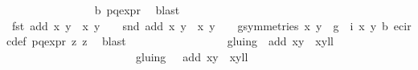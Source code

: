 \begin{isabellebody}
\ \ \ \ \ \ \ \ \ \ \ \ \ \ \isamarkupfalse%
\ b{\isacharparenleft}{}{\isacharparenright}\ p{\isacharunderscore}q{\isacharunderscore}expr{\isacharparenleft}{}{\isacharparenright}\ \isamarkupfalse%
\ blast\ \ \isanewline
\ \ \ \ \ \ \ \ \ \ \ \ \ \ \isamarkupfalse%
\ {\isacartoucheopen}fst\ {\isacharparenleft}add\ {\isacharparenleft}x{\isacharcomma}\ y{\isacharparenright}\ {\isacharparenleft}{\isasymtau}\ {\isacharparenleft}x{\isacharprime}{\isacharcomma}\ y{\isacharprime}{\isacharparenright}{\isacharparenright}{\isacharparenright}\ {\isacharequal}\ {}\ {\isasymor}\ snd\ {\isacharparenleft}add\ {\isacharparenleft}x{\isacharcomma}\ y{\isacharparenright}\ {\isacharparenleft}{\isasymtau}\ {\isacharparenleft}x{\isacharprime}{\isacharcomma}\ y{\isacharprime}{\isacharparenright}{\isacharparenright}{\isacharparenright}\ {\isacharequal}\ {}\ {\isasymLongrightarrow}\ {\isasymexists}g{\isasymin}symmetries{\isachardot}\ {\isacharparenleft}x{\isacharprime}{\isacharcomma}\ y{\isacharprime}{\isacharparenright}\ {\isacharequal}\ {\isacharparenleft}g\ {\isasymcirc}\ i{\isacharparenright}\ {\isacharparenleft}x{\isacharcomma}\ y{\isacharparenright}{\isacartoucheclose}\ b{\isacharparenleft}{}{\isacharparenright}\ e{\isacharunderscore}circ{\isacharunderscore}def\ p{\isacharunderscore}q{\isacharunderscore}expr{\isacharparenleft}{}{\isacharparenright}\ z{}{\isacharparenleft}{}{\isacharparenright}\ z{}{\isacharparenleft}{}{\isacharparenright}\ \isamarkupfalse%
\ blast\ \isanewline
\ \ \ \ \ \ \ \ \ \ \ \ \isamarkupfalse%
\ \isamarkupfalse%
\ {}{\isacharcolon}\ {\isachardoublequoteopen}gluing\ {\isacharbackquote}{\isacharbackquote}\ {\isacharbraceleft}{\isacharparenleft}{\isacharparenleft}add\ {\isacharparenleft}x{\isacharcomma}y{\isacharparenright}\ {\isacharparenleft}{\isasymtau}\ {\isacharparenleft}x{\isacharprime}{\isacharcomma}y{\isacharprime}{\isacharparenright}{\isacharparenright}{\isacharparenright}{\isacharcomma}l{\isacharplus}l{\isacharprime}{\isacharplus}{}{\isacharparenright}{\isacharbraceright}\ {\isacharequal}\isanewline
\ \ \ \ \ \ \ \ \ \ \ \ \ \ \ \ \ \ \ \ \ \ \ gluing\ {\isacharbackquote}{\isacharbackquote}\ {\isacharbraceleft}{\isacharparenleft}{\isasymtau}\ {\isacharparenleft}add\ {\isacharparenleft}x{\isacharcomma}y{\isacharparenright}\ {\isacharparenleft}{\isasymtau}\ {\isacharparenleft}x{\isacharprime}{\isacharcomma}y{\isacharprime}{\isacharparenright}{\isacharparenright}{\isacharparenright}{\isacharcomma}l{\isacharplus}l{\isacharprime}{\isacharparenright}{\isacharbraceright}{\isachardoublequoteclose}\isanewline

\end{isabellebody}
